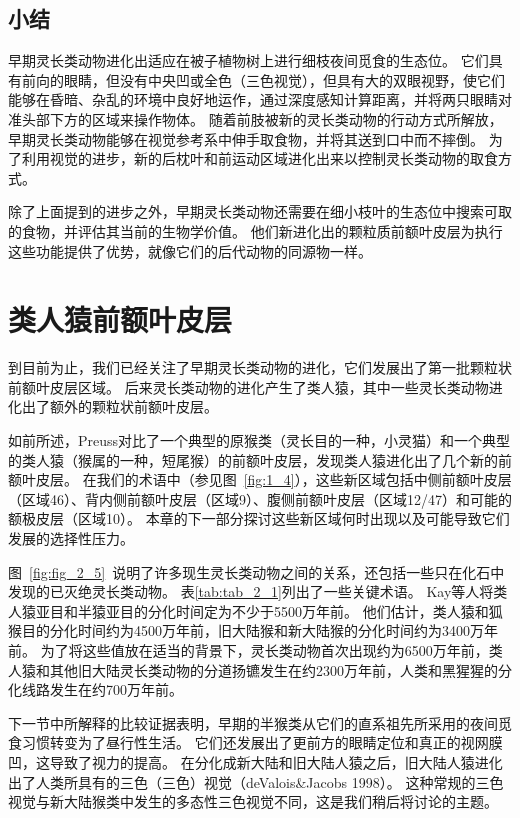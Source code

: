 \subsection{小结}

早期灵长类动物进化出适应在被子植物树上进行细枝夜间觅食的生态位。
它们具有前向的眼睛，但没有中央凹或全色（三色视觉），但具有大的双眼视野，使它们能够在昏暗、杂乱的环境中良好地运作，通过深度感知计算距离，并将两只眼睛对准头部下方的区域来操作物体。
随着前肢被新的灵长类动物的行动方式所解放，早期灵长类动物能够在视觉参考系中伸手取食物，并将其送到口中而不摔倒。
为了利用视觉的进步，新的后枕叶和前运动区域进化出来以控制灵长类动物的取食方式。


除了上面提到的进步之外，早期灵长类动物还需要在细小枝叶的生态位中搜索可取的食物，并评估其当前的生物学价值。
他们新进化出的颗粒质前额叶皮层为执行这些功能提供了优势，就像它们的后代动物的同源物一样。



\section{类人猿前额叶皮层}

到目前为止，我们已经关注了早期灵长类动物的进化，它们发展出了第一批颗粒状前额叶皮层区域。
后来灵长类动物的进化产生了类人猿，其中一些灵长类动物进化出了额外的颗粒状前额叶皮层。


如前所述，Preuss\cite{preuss1991myelo}对比了一个典型的原猴类（灵长目的一种，小灵猫）和一个典型的类人猿（猴属的一种，短尾猴）的前额叶皮层，发现类人猿进化出了几个新的前额叶皮层。
在我们的术语中（参见图~\ref{fig:1_4}），这些新区域包括中侧前额叶皮层（区域46）、背内侧前额叶皮层（区域9）、腹侧前额叶皮层（区域12/47）和可能的额极皮层（区域10）。
本章的下一部分探讨这些新区域何时出现以及可能导致它们发展的选择性压力。


图~\ref{fig:fig_2_5}~说明了许多现生灵长类动物之间的关系，还包括一些只在化石中发现的已灭绝灵长类动物。
表\ref{tab:tab_2_1}列出了一些关键术语。
Kay等人将类人猿亚目和半猿亚目的分化时间定为不少于5500万年前\cite{kay2004anthropoid}。
他们估计，类人猿和狐猴目的分化时间约为4500万年前，旧大陆猴和新大陆猴的分化时间约为3400万年前。
为了将这些值放在适当的背景下，灵长类动物首次出现约为6500万年前，类人猿和其他旧大陆灵长类动物的分道扬镳发生在约2300万年前，人类和黑猩猩的分化线路发生在约700万年前。


下一节中所解释的比较证据表明，早期的半猴类从它们的直系祖先所采用的夜间觅食习惯转变为了昼行性生活。
它们还发展出了更前方的眼睛定位和真正的视网膜凹，这导致了视力的提高。
在分化成新大陆和旧大陆人猿之后，旧大陆人猿进化出了人类所具有的三色（三色）视觉\cite{williams2010new}（deValois\&Jacobs 1998）。
这种常规的三色视觉与新大陆猴类中发生的多态性三色视觉不同，这是我们稍后将讨论的主题。


